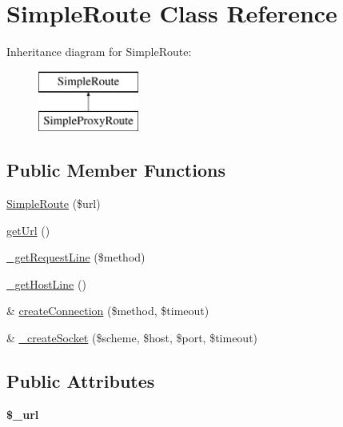 \hypertarget{class_simple_route}{
\section{SimpleRoute Class Reference}
\label{class_simple_route}
}
Inheritance diagram for SimpleRoute:\begin{figure}[H]
\begin{center}
\leavevmode
\includegraphics[height=2.000000cm]{class_simple_route}
\end{center}
\end{figure}
\subsection*{Public Member Functions}
\begin{DoxyCompactItemize}
\item 
\hyperlink{class_simple_route_aad5ce6e580494698a068f67ebf9c3c6e}{SimpleRoute} (\$url)
\item 
\hyperlink{class_simple_route_ac4c2ad3f89c50dd48d9bc66e828dac4c}{getUrl} ()
\item 
\hyperlink{class_simple_route_a7480c99e9ebcac13f1d84b4eb676f02d}{\_\-getRequestLine} (\$method)
\item 
\hyperlink{class_simple_route_af9b3205667c83b683a9636eaabc8f485}{\_\-getHostLine} ()
\item 
\& \hyperlink{class_simple_route_a686424eff035f1a37bbf13e997a072af}{createConnection} (\$method, \$timeout)
\item 
\& \hyperlink{class_simple_route_ad064d21e767491c8dd0e9a70ec2d1110}{\_\-createSocket} (\$scheme, \$host, \$port, \$timeout)
\end{DoxyCompactItemize}
\subsection*{Public Attributes}
\begin{DoxyCompactItemize}
\item 
\hypertarget{class_simple_route_a5fa56b19cb962b887b6c04e59784e64f}{
{\bfseries \$\_\-url}}
\label{class_simple_route_a5fa56b19cb962b887b6c04e59784e64f}

\end{DoxyCompactItemize}


